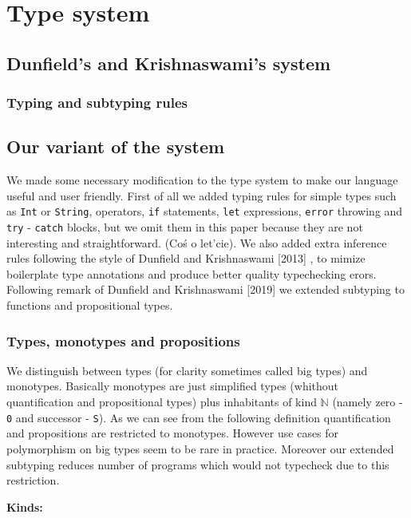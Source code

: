 \documentclass[declaration,shortabstract,english]{iithesis}
\begin{document}
\chapter{Type system}
\section{Dunfield's and Krishnaswami's system}

\subsection*{Typing and subtyping rules}

\section{Our variant of the system}
We made some necessary modification to the type system to make our language useful and user friendly.
First of all we added typing rules for simple types such as
\verb+Int+ or \verb+String+, operators, \verb+if+ statements, \verb+let+ expressions,
\verb+error+ throwing and \verb+try+ - \verb+catch+ blocks, but we omit them in this paper because
they are not interesting and straightforward. (Coś o let'cie). We also
added extra inference rules following the style of Dunfield and Krishnaswami [2013] \cite{Dunfield13:bidir},
to mimize boilerplate type annotations and produce better quality typechecking erors. Following
remark of Dunfield and Krishnaswami [2019] \cite{gadt-popl19} we extended subtyping to functions and propositional types.



\subsection*{Types, monotypes and propositions}

We distinguish between types (for clarity sometimes called big types) and monotypes.
Basically monotypes are just simplified types (whithout quantification and propositional types) plus
inhabitants of kind $\mathbb{N}$ (namely zero - \verb+0+ and successor - \verb+S+).
As we can see from the following definition quantification and propositions are restricted to monotypes.
However use cases for polymorphism on big types seem to be rare in practice. Moreover our extended subtyping
reduces number of programs which would not typecheck due to this restriction.

\textbf{Kinds:}
\end{document}
